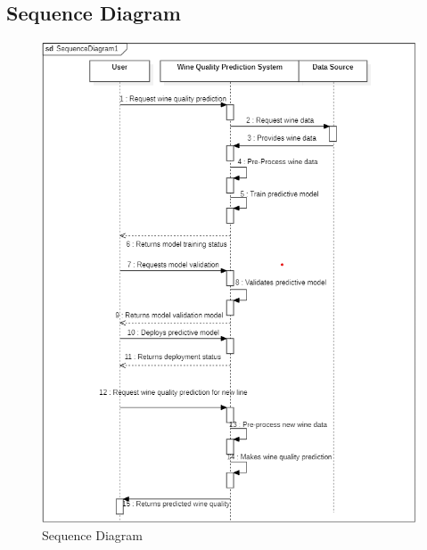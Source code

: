 \documentclass[a4paper, 12pt]{report}
\begin{document}
\subsection{Sequence Diagram }
\begin{figure}[h]
\centering
\includegraphics[width=0.9\linewidth]{./wine sequence daigram.png}
\caption{Sequence Diagram}
\end{figure}
\pagebreak
\end{document}
